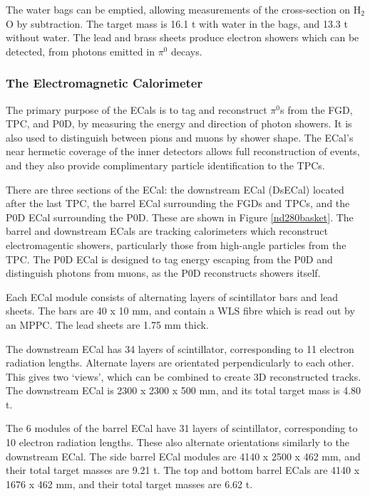 The water bags can be emptied, allowing measurements of the cross-section on H$_2$O by subtraction. The target mass is 16.1 t with water in the bags, and 13.3 t without water. The lead and brass sheets produce electron showers which can be detected, from photons emitted in $\pi^0$ decays.

\subsubsection{The Electromagnetic Calorimeter}\label{sec:ecal}

The primary purpose of the ECals is to tag and reconstruct $\pi^0$s from the FGD, TPC, and P0D, by measuring the energy and direction of photon showers. It is also used to distinguish between pions and muons by shower shape. The ECal's near hermetic coverage of the inner detectors allows full reconstruction of events, and they also provide complimentary particle identification to the TPCs.

There are three sections of the ECal: the downstream ECal (DsECal) located after the last TPC, the barrel ECal surrounding the FGDs and TPCs, and the P0D ECal surrounding the P0D. These are shown in Figure \ref{nd280basket}. The barrel and downstream ECals are tracking calorimeters which reconstruct electromagentic showers, particularly those from high-angle particles from the TPC. The P0D ECal is designed to tag energy escaping from the P0D and distinguish photons from muons, as the P0D reconstructs showers itself.

Each ECal module consists of alternating layers of scintillator bars and lead sheets. The bars are 40 x 10 mm, and contain a WLS fibre which is read out by an MPPC. The lead sheets are 1.75 mm thick.

The downstream ECal has 34 layers of scintillator, corresponding to 11 electron radiation lengths. Alternate layers are orientated perpendicularly to each other. This gives two `views', which can be combined to create 3D reconstructed tracks. The downstream ECal is 2300 x 2300 x 500 mm, and its total target mass is 4.80 t.

The 6 modules of the barrel ECal have 31 layers of scintillator, corresponding to 10 electron radiation lengths. These also alternate orientations similarly to the downstream ECal. The side barrel ECal modules are 4140 x 2500 x 462 mm, and their total target masses are 9.21 t. The top and bottom barrel ECals are 4140 x 1676 x 462 mm, and their total target masses are 6.62 t.

